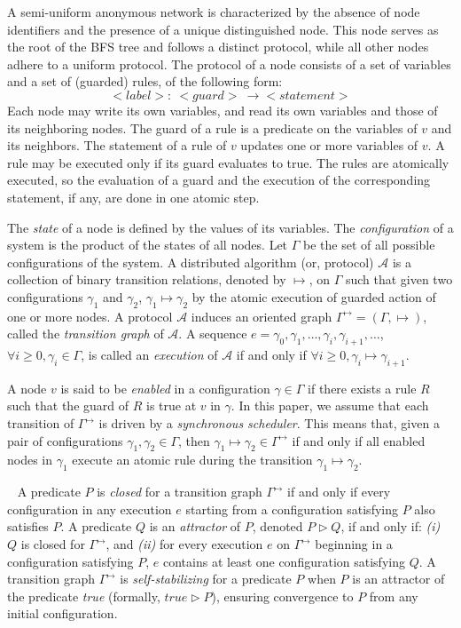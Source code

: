\documentclass[a4paper, 12pt]{article}
\newcommand{\monparagraph}[1]{\smallskip\noindent{\bf #1}\ }
\begin{document}
A semi-uniform anonymous network is characterized by the absence of node identifiers and the presence of a unique distinguished node. This node serves as the root of the BFS tree and follows a distinct protocol, while all other nodes adhere to a uniform protocol.
The protocol of a node consists of a set of variables and a set of (guarded) rules, of the following form: 
$$<label>:\ <guard>\ \longrightarrow <statement>$$
Each node may write its own variables, and read its own variables and those of its neighboring nodes.
The guard of a rule is a predicate on the variables of $v$ and its neighbors. The statement of a rule of $v$ updates one or more variables of $v$. 
A rule may be executed only if its guard evaluates to true.   
The rules are atomically executed, so the evaluation of a guard and the execution of the corresponding statement, if any, are done in one atomic step.

The \textit{state} of a node is defined by the values of its variables.
The \textit{configuration} of a system is the product of the states of all nodes. 
Let $\Gamma$ be the set of all possible configurations of the system.
A distributed algorithm (or, protocol) $\mathcal{A}$ is a collection of binary transition
relations, denoted by $\mapsto$, on $\Gamma$ such that given two configurations $\gamma_1$ and $\gamma_2$, 
$\gamma_1 \mapsto \gamma_2$ by the atomic execution of guarded action of one or more nodes.  
A protocol  $\mathcal{A}$ induces an oriented graph $\Gamma^{\mapsto} =(\Gamma, \mapsto)$, called the \textit{transition graph} of $\mathcal{A}$.
A sequence $e=\gamma_0, \gamma_1, \ldots, \gamma_i,\gamma_{i+1},\ldots$, $\forall i\geq 0, \gamma_i \in \Gamma$, is called an \textit{execution} of $\mathcal{A}$ if and only if $\forall i\geq 0, \gamma_{i}\mapsto \gamma _{i+1} $. 

A node $v$ is said to be \textit{enabled} in a configuration $\gamma \in \Gamma$ if there exists a rule $R$ such that 
the guard of $R$ is true at $v$ in $\gamma$.
%
In this paper, we assume that each transition of $\Gamma^{\mapsto}$ is driven by a \textit{synchronous scheduler}. 
This means that, given a pair of configurations $\gamma_1, \gamma_2 \in \Gamma$, then $\gamma_1\mapsto \gamma_2 \in \Gamma^{\mapsto}$ if and only if all enabled nodes in $\gamma_1$ execute an atomic rule during the transition $\gamma_1 \mapsto \gamma_2$. 

\monparagraph{Self-Stabilization.}
A predicate $P$ is \textit{closed} for a transition graph $\Gamma^{\mapsto}$ if and only if every configuration in any execution $e$ starting from a configuration satisfying $P$ also satisfies $P$.  
A predicate $Q$ is an \textit{attractor} of $P$, denoted $P \vartriangleright Q$, if and only if:  
\textit{(i)} $Q$ is closed for $\Gamma^{\mapsto}$, and \textit{(ii)} for every execution $e$ on $\Gamma^{\mapsto}$ beginning in a configuration satisfying $P$, $e$ contains at least one configuration satisfying $Q$.  
A transition graph $\Gamma^{\mapsto}$ is \textit{self-stabilizing} for a predicate $P$ when $P$ is an attractor of the predicate \textit{true} (formally, $\mathit{true} \vartriangleright P$), ensuring convergence to $P$ from any initial configuration.  
\end{document}

